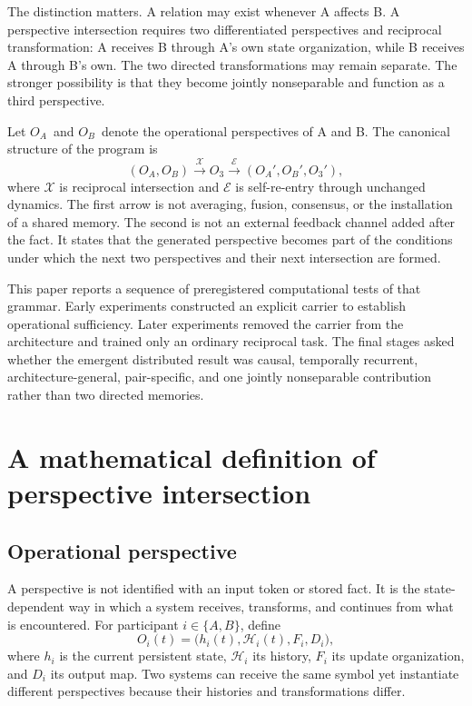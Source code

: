 \documentclass[11pt,a4paper]{article}
\newcommand{\OA}{\ensuremath{O_{A}}}
\newcommand{\OB}{\ensuremath{O_{B}}}
\newcommand{\Othree}{\ensuremath{O_{3}}}
\begin{document}
The distinction matters. A relation may exist whenever A affects B. A perspective intersection requires two differentiated perspectives and reciprocal transformation: A receives B through A's own state organization, while B receives A through B's own. The two directed transformations may remain separate. The stronger possibility is that they become jointly nonseparable and function as a third perspective.

Let \OA\ and \OB\ denote the operational perspectives of A and B. The canonical structure of the program is
\begin{equation}
 (\OA,\OB)
 \xrightarrow{\mathcal X}
 \Othree
 \xrightarrow{\mathcal E}
 (\OA',\OB',\Othree'),
 \label{eq:canonical}
\end{equation}
where $\mathcal X$ is reciprocal intersection and $\mathcal E$ is self-re-entry through unchanged dynamics. The first arrow is not averaging, fusion, consensus, or the installation of a shared memory. The second is not an external feedback channel added after the fact. It states that the generated perspective becomes part of the conditions under which the next two perspectives and their next intersection are formed.

This paper reports a sequence of preregistered computational tests of that grammar. Early experiments constructed an explicit carrier to establish operational sufficiency. Later experiments removed the carrier from the architecture and trained only an ordinary reciprocal task. The final stages asked whether the emergent distributed result was causal, temporally recurrent, architecture-general, pair-specific, and one jointly nonseparable contribution rather than two directed memories.

\section{A mathematical definition of perspective intersection}

\subsection{Operational perspective}

A perspective is not identified with an input token or stored fact. It is the state-dependent way in which a system receives, transforms, and continues from what is encountered. For participant $i\in\{A,B\}$, define
\begin{equation}
 O_i(t)=\bigl(h_i(t),\mathcal H_i(t),F_i,D_i\bigr),
 \label{eq:perspective}
\end{equation}
where $h_i$ is the current persistent state, $\mathcal H_i$ its history, $F_i$ its update organization, and $D_i$ its output map. Two systems can receive the same symbol yet instantiate different perspectives because their histories and transformations differ.
\end{document}
